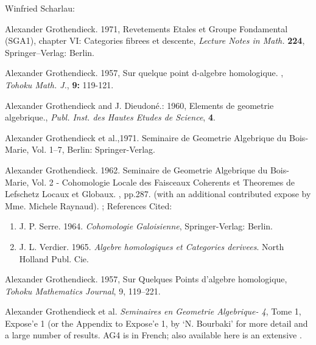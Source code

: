\documentclass[12pt]{article}
\theoremstyle{plain}
\theoremstyle{definition}
\numberwithin{equation}{section}
\begin{document}
\begin{thebibliography}{99}

Winfried Scharlau: 

Alexander Grothendieck. 1971, Revetements Etales et Groupe Fondamental (SGA1),
chapter VI: Categories fibrees et descente, \emph{Lecture Notes in Math.}
\textbf{224}, Springer--Verlag: Berlin.

Alexander Grothendieck. 1957, Sur quelque point d-algebre homologique. , \emph{Tohoku Math. J.}, \textbf{9:} 119-121.

Alexander Grothendieck and J. Dieudon\'{e}.: 1960, Elements de geometrie algebrique., \emph{Publ. Inst. des Hautes Etudes de Science}, \textbf{4}.

Alexander Grothendieck et al.,1971. Seminaire de Geometrie Algebrique du Bois-Marie, Vol. 1--7, Berlin: Springer-Verlag.

Alexander Grothendieck. 1962. Seminaire de Geometrie Algebrique du Bois-Marie, Vol. 2 - Cohomologie Locale des Faisceaux Coherents et Theoremes de Lefschetz Locaux et Globaux. , pp.287. (with an additional contributed expose by Mme. Michele Raynaud). 
;
References Cited: 
\begin{enumerate}
\item J. P. Serre. 1964. {\em Cohomologie Galoisienne}, Springer-Verlag: Berlin.
\item J. L. Verdier. 1965. {\em Algebre homologiques et Categories derivees}. North Holland Publ. Cie.
\end{enumerate}

Alexander Grothendieck. 1957, Sur Quelques Points d'algebre homologique, {\em Tohoku Mathematics Journal}, 9, 119--221.
 
Alexander Grothendieck et al. \emph{Seminaires en Geometrie Algebrique- 4}, Tome 1, Expose'e 1 
(or the Appendix to Expose'e 1, by `N. Bourbaki' for more detail and a large number of results.
AG4 is  in French;
also available here is an extensive 
.


\end{thebibliography}
\end{document}

